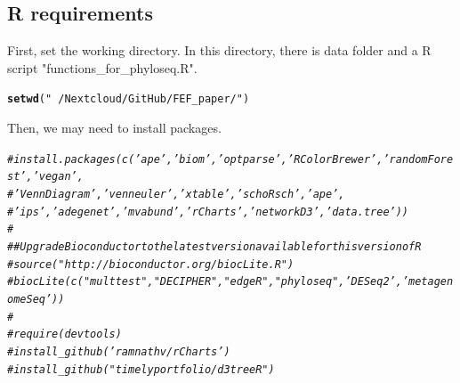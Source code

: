 \documentclass[12pt]{article}\usepackage[]{graphicx}\usepackage[]{color}
\makeatletter
\newcommand{\hlstr}[1]{\textcolor[rgb]{0.192,0.494,0.8}{#1}}%
\newcommand{\hlcom}[1]{\textcolor[rgb]{0.678,0.584,0.686}{\textit{#1}}}%
\newcommand{\hlstd}[1]{\textcolor[rgb]{0.345,0.345,0.345}{#1}}%
\newcommand{\hlkwd}[1]{\textcolor[rgb]{0.737,0.353,0.396}{\textbf{#1}}}%
\newenvironment{kframe}{%
 \def\at@end@of@kframe{}%
 \ifinner\ifhmode%
  \def\at@end@of@kframe{\end{minipage}}%
  \begin{minipage}{\columnwidth}%
 \fi\fi%
 \def\FrameCommand##1{\hskip\@totalleftmargin \hskip-\fboxsep
 \colorbox{shadecolor}{##1}\hskip-\fboxsep
     \hskip-\linewidth \hskip-\@totalleftmargin \hskip\columnwidth}%
 \MakeFramed {\advance\hsize-\width
   \@totalleftmargin\z@ \linewidth\hsize
   \@setminipage}}%
 {\par\unskip\endMakeFramed%
 \at@end@of@kframe}
\newenvironment{knitrout}{}{} %
\numberwithin{figure}{section}
\makeatother
\begin{document}
\subsection{R requirements}

First, set the working directory. In this directory, there is data folder and a R script "functions\_for\_phyloseq.R".

\begin{knitrout}\small
{}\color{fgcolor}\begin{kframe}
\begin{alltt}
\hlkwd{setwd}\hlstd{(}\hlstr{"~/Nextcloud/GitHub/FEF_paper/"}\hlstd{)}
\end{alltt}
\end{kframe}
\end{knitrout}

Then, we may need to install packages.
\begin{knitrout}\small
{}\color{fgcolor}\begin{kframe}
\begin{alltt}
\hlcom{#  install.packages(c('ape', 'biom', 'optparse', 'RColorBrewer', 'randomForest',  'vegan',}
\hlcom{#                    'VennDiagram', 'venneuler', 'xtable', 'schoRsch', 'ape',}
\hlcom{#                   'ips', 'adegenet', 'mvabund', 'rCharts', 'networkD3', 'data.tree'))}
\hlcom{#}
\hlcom{# # Upgrade Bioconductor to the latest version available for this version of R}
\hlcom{# source("http://bioconductor.org/biocLite.R")}
\hlcom{# biocLite(c("multtest", "DECIPHER", "edgeR", "phyloseq", 'DESeq2', 'metagenomeSeq'))}
\hlcom{#}
\hlcom{# require(devtools)}
\hlcom{# install_github('ramnathv/rCharts')}
\hlcom{# install_github("timelyportfolio/d3treeR")}
\end{alltt}
\end{kframe}
\end{knitrout}
\end{document}
